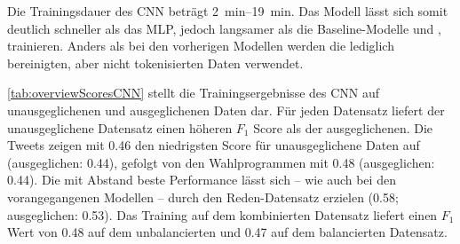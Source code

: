 Die Trainingsdauer des \ac{CNN} beträgt \SIrange{2}{19}{\minute}. Das Modell lässt sich somit deutlich schneller als das \ac{MLP}, jedoch langsamer als die Baseline-Modelle und \ft, trainieren. Anders als bei den vorherigen Modellen werden die lediglich bereinigten, aber nicht tokenisierten Daten verwendet.

\autoref{tab:overviewScoresCNN} stellt die Trainingsergebnisse des \ac{CNN} auf unausgeglichenen und ausgeglichenen Daten dar. Für jeden Datensatz liefert der unausgeglichene Datensatz einen höheren \(F_1\) Score als der ausgeglichenen. Die Tweets zeigen mit \num{0.46} den niedrigsten Score für unausgeglichene Daten auf (ausgeglichen: \num{0.44}), gefolgt von den Wahlprogrammen mit \num{0.48} (ausgeglichen: \num{0.44}). Die mit Abstand beste Performance lässt sich -- wie auch bei den vorangegangenen Modellen -- durch den Reden-Datensatz erzielen (\num{0.58}; ausgeglichen: \num{0.53}). Das Training auf dem kombinierten Datensatz liefert einen \(F_1\) Wert von \num{0.48} auf dem unbalancierten und \num{0.47} auf dem balancierten Datensatz.

